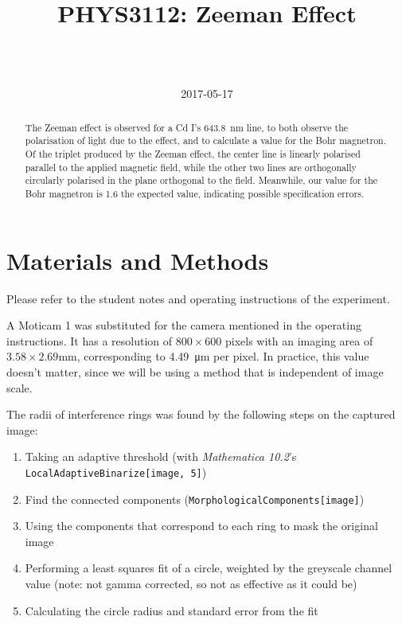 \documentclass[a4paper]{scrartcl}
\begin{document}
\title{PHYS3112: Zeeman Effect}
\author{ \\ \\ }
\date{2017-05-17}
\maketitle

\begin{abstract}
    The Zeeman effect is observed for a Cd I's \SI{643.8}{\nano\metre} line, to both observe the polarisation of light due to the effect, and to calculate a value for the Bohr magnetron. Of the triplet produced by the Zeeman effect, the center line is linearly polarised parallel to the applied magnetic field, while the other two lines are orthogonally circularly polarised in the plane orthogonal to the field. Meanwhile, our value for the Bohr magnetron is 1.6 the expected value, indicating possible specification errors.
\end{abstract}

\section{Materials and Methods}
Please refer to the student notes and operating instructions of the experiment.

A Moticam 1 was substituted for the camera mentioned in the operating instructions. It has a resolution of \(800 \times 600\) pixels with an imaging area of \(3.58 \times 2.69 \si{\milli\metre}\), corresponding to \SI{4.49}{\micro\metre} per pixel. In practice, this value doesn't matter, since we will be using a method that is independent of image scale.

The radii of interference rings was found by the following steps on the captured image:
\begin{enumerate}
    \item Taking an adaptive threshold (with \emph{Mathematica 10.2}'s \texttt{LocalAdaptiveBinarize[image, 5]})
    \item Find the connected components (\texttt{MorphologicalComponents[image]})
    \item Using the components that correspond to each ring to mask the original image
    \item Performing a least squares fit of a circle, weighted by the greyscale channel value (note: not gamma corrected, so not as effective as it could be)
    \item Calculating the circle radius and standard error from the fit
\end{enumerate}
\end{document}
